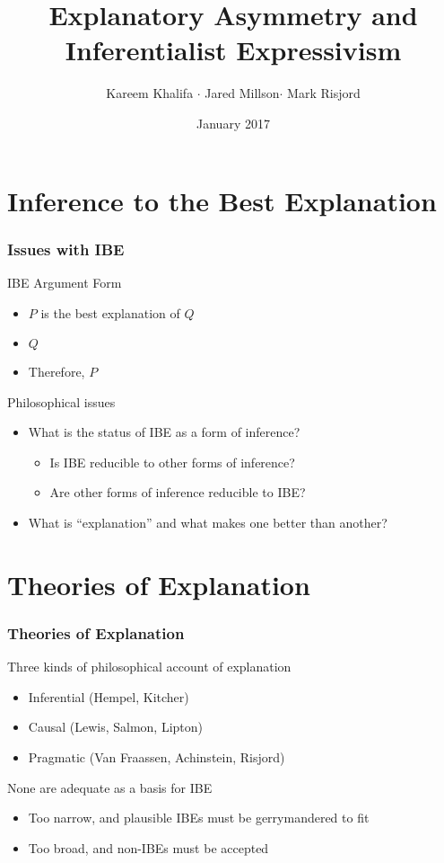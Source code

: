 \documentclass[xcolor=dvipsnames,12pt,handout]{beamer}
\title{Explanatory Asymmetry and Inferentialist Expressivism}
\author{ Kareem Khalifa $ \cdot $  Jared Millson$ \cdot $ Mark Risjord }
\date{January 2017}
\institute{Jared Millson\\ Department of Philosophy, Agnes Scott College\\[1ex]
  \texttt{jmillson@agnesscott.edu}}
\let\oldframetitle\frametitle%
\renewcommand{\frametitle}[1]{%
  \oldframetitle{#1}\setstretch{1.2}}
\begin{document}
\begin{frame}
\titlepage
\end{frame}

\section{Inference to the Best Explanation}


\begin{frame}\frametitle{Issues with IBE}
	\begin{block}{IBE Argument Form}	
		\begin{itemize}
			\item[] $P$ is the best explanation of $Q$
			\item[] $Q$
			\item[] Therefore, $P$
		\end{itemize}
	\end{block}
\pause
	\vspace{.5cm}
	Philosophical issues
	\begin{itemize}
		\item What is the status of IBE as a form of inference?
			\begin{itemize}
				\item Is IBE reducible to other forms of inference?
				\item Are other forms of inference reducible to IBE?
			\end{itemize}
		\item<3> What is ``explanation'' and what makes one better than another?
	\end{itemize}	
\end{frame}

\section{Theories of Explanation}

\begin{frame}\frametitle{Theories of Explanation}
	
	Three kinds of philosophical account of explanation
	\begin{itemize}
		\item Inferential (Hempel, Kitcher)
		\item Causal  (Lewis, Salmon, Lipton)
		\item Pragmatic  (Van Fraassen, Achinstein, Risjord)
	\end{itemize}
\pause
	None are adequate as a basis for IBE
	\begin{itemize} 
		\item Too narrow, and plausible IBEs must be gerrymandered to fit
		\item Too broad, and non-IBEs must be accepted
	\end{itemize}
\end{frame}
\end{document}
